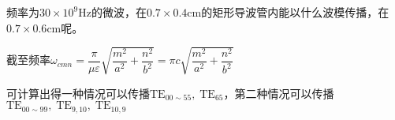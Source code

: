 \documentclass{mynote}
\begin{document}
\begin{exercise}{4.13}
频率为$30 \times 10^9 \textrm{Hz}$的微波，在$0.7 \times 0.4 \textrm{cm}$的矩形导波管内能以什么波模传播，在$0.7 \times 0.6 \textrm{cm}$呢。
\end{exercise}
\begin{solution}
截至频率$\omega_{cmn} = \dfrac{\pi}{\mu \varepsilon} \sqrt{\dfrac{m^2}{a^2} + \dfrac{n^2}{b^2}} = \pi c \sqrt{\dfrac{m^2}{a^2} + \dfrac{n^2}{b^2}} $

可计算出得一种情况可以传播$\textrm{TE}_{00 \sim 55},\;\textrm{TE}_{65} $，第二种情况可以传播$\textrm{TE}_{00 \sim 99},\; \textrm{TE}_{9,10},\; \textrm{TE}_{10, 9}$
\end{solution}
\end{document}
